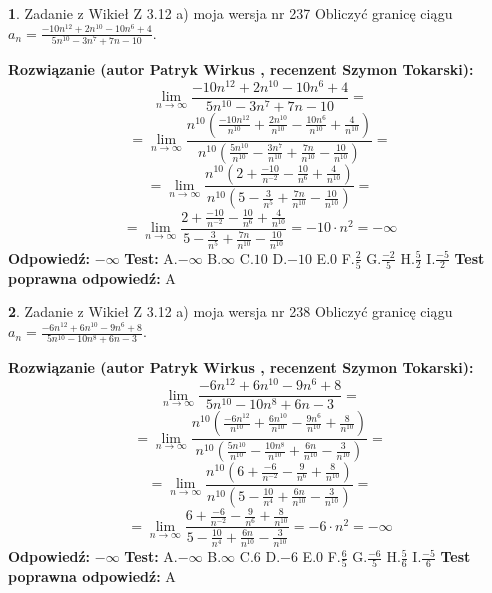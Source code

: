 \documentclass[12pt, a4paper]{article}
\theoremstyle{definition} %
\newtheorem{zad}{}
\newcommand{\zadStart}[1]{\begin{zad}#1\newline}
\newcommand{\zadStop}{\end{zad}}
\newcommand{\rozwStart}[2]{\noindent \textbf{Rozwiązanie (autor #1 , recenzent #2): }\newline}
\newcommand{\rozwStop}{\newline}
\newcommand{\odpStart}{\noindent \textbf{Odpowiedź:}\newline}
\newcommand{\odpStop}{\newline}
\newcommand{\testStart}{\noindent \textbf{Test:}\newline}
\newcommand{\testStop}{\newline}
\newcommand{\kluczStart}{\noindent \textbf{Test poprawna odpowiedź:}\newline}
\newcommand{\kluczStop}{\newline}
\begin{document}
\zadStart{Zadanie z Wikieł Z 3.12 a) moja wersja nr 237}
Obliczyć granicę ciągu $a_{n}=\frac{-10n^{12}+2n^{10}-10n^{6}+4}{5n^{10}-3n^{7}+7n-10}$.
\zadStop
\rozwStart{Patryk Wirkus}{Szymon Tokarski}
$$\lim\limits_{n\to\infty}\frac{-10n^{12}+2n^{10}-10n^{6}+4}{5n^{10}-3n^{7}+7n-10}=$$
$$=\lim\limits_{n\to\infty}\frac{n^{10}\left(\frac{-10n^{12}}{n^{10}}+\frac{2n^{10}}{n^{10}}-\frac{10n^{6}}{n^{10}}+\frac{4}{n^{10}}\right)}{n^{10}\left(\frac{5n^{10}}{n^{10}}-\frac{3n^{7}}{n^{10}}+\frac{7n}{n^{10}}-\frac{10}{n^{10}}\right)}=$$
$$=\lim\limits_{n\to\infty}\frac{n^{10}\left(2+\frac{-10}{n^{-2}}-\frac{10}{n^{6}}+\frac{4}{n^{10}}\right)}
{n^{10}\left(5-\frac{3}{n^{5}}+\frac{7n}{n^{10}}-\frac{10}{n^{10}}\right)}=$$
$$=\lim\limits_{n\to\infty}\frac{2+\frac{-10}{n^{-2}}-\frac{10}{n^{6}}+\frac{4}{n^{10}}}{5-\frac{3}{n^{5}}+\frac{7n}{n^{10}}-\frac{10}{n^{10}}}=-10\cdot n^{2} = -\infty$$
\rozwStop
\odpStart
$-\infty$
\odpStop
\testStart
A.$-\infty$
B.$\infty$
C.$10$
D.$-10$
E.$0$
F.$\frac{2}{5}$
G.$\frac{-2}{5}$
H.$\frac{5}{2}$
I.$\frac{-5}{2}$
\testStop
\kluczStart
A
\kluczStop



\zadStart{Zadanie z Wikieł Z 3.12 a) moja wersja nr 238}
Obliczyć granicę ciągu $a_{n}=\frac{-6n^{12}+6n^{10}-9n^{6}+8}{5n^{10}-10n^{8}+6n-3}$.
\zadStop
\rozwStart{Patryk Wirkus}{Szymon Tokarski}
$$\lim\limits_{n\to\infty}\frac{-6n^{12}+6n^{10}-9n^{6}+8}{5n^{10}-10n^{8}+6n-3}=$$
$$=\lim\limits_{n\to\infty}\frac{n^{10}\left(\frac{-6n^{12}}{n^{10}}+\frac{6n^{10}}{n^{10}}-\frac{9n^{6}}{n^{10}}+\frac{8}{n^{10}}\right)}{n^{10}\left(\frac{5n^{10}}{n^{10}}-\frac{10n^{8}}{n^{10}}+\frac{6n}{n^{10}}-\frac{3}{n^{10}}\right)}=$$
$$=\lim\limits_{n\to\infty}\frac{n^{10}\left(6+\frac{-6}{n^{-2}}-\frac{9}{n^{6}}+\frac{8}{n^{10}}\right)}
{n^{10}\left(5-\frac{10}{n^{4}}+\frac{6n}{n^{10}}-\frac{3}{n^{10}}\right)}=$$
$$=\lim\limits_{n\to\infty}\frac{6+\frac{-6}{n^{-2}}-\frac{9}{n^{6}}+\frac{8}{n^{10}}}{5-\frac{10}{n^{4}}+\frac{6n}{n^{10}}-\frac{3}{n^{10}}}=-6\cdot n^{2} = -\infty$$
\rozwStop
\odpStart
$-\infty$
\odpStop
\testStart
A.$-\infty$
B.$\infty$
C.$6$
D.$-6$
E.$0$
F.$\frac{6}{5}$
G.$\frac{-6}{5}$
H.$\frac{5}{6}$
I.$\frac{-5}{6}$
\testStop
\kluczStart
A
\kluczStop
\end{document}
